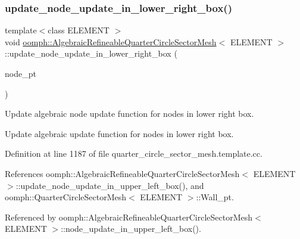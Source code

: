 \subsubsection{\texorpdfstring{update\+\_\+node\+\_\+update\+\_\+in\+\_\+lower\+\_\+right\+\_\+box()}{update\_node\_update\_in\_lower\_right\_box()}}
{\footnotesize\ttfamily template$<$class E\+L\+E\+M\+E\+NT $>$ \\
void \hyperlink{classoomph_1_1AlgebraicRefineableQuarterCircleSectorMesh}{oomph\+::\+Algebraic\+Refineable\+Quarter\+Circle\+Sector\+Mesh}$<$ E\+L\+E\+M\+E\+NT $>$\+::update\+\_\+node\+\_\+update\+\_\+in\+\_\+lower\+\_\+right\+\_\+box (\begin{DoxyParamCaption}\item[{Algebraic\+Node $\ast$\&}]{node\+\_\+pt }\end{DoxyParamCaption})\hspace{0.3cm}{\ttfamily [private]}}



Update algebraic node update function for nodes in lower right box. 

Update algebraic update function for nodes in lower right box. 

Definition at line 1187 of file quarter\+\_\+circle\+\_\+sector\+\_\+mesh.\+template.\+cc.



References oomph\+::\+Algebraic\+Refineable\+Quarter\+Circle\+Sector\+Mesh$<$ E\+L\+E\+M\+E\+N\+T $>$\+::update\+\_\+node\+\_\+update\+\_\+in\+\_\+upper\+\_\+left\+\_\+box(), and oomph\+::\+Quarter\+Circle\+Sector\+Mesh$<$ E\+L\+E\+M\+E\+N\+T $>$\+::\+Wall\+\_\+pt.



Referenced by oomph\+::\+Algebraic\+Refineable\+Quarter\+Circle\+Sector\+Mesh$<$ E\+L\+E\+M\+E\+N\+T $>$\+::node\+\_\+update\+\_\+in\+\_\+upper\+\_\+left\+\_\+box().

\mbox{\label{classoomph_1_1AlgebraicRefineableQuarterCircleSectorMesh_ab1e4847ffef953e66aafff14f35b7141}} 
